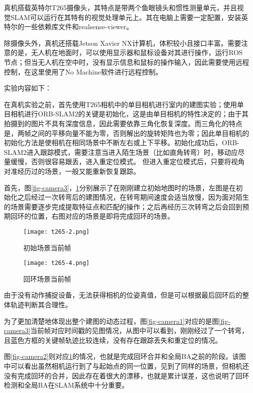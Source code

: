 真机搭载英特尔T265摄像头，其特点是带两个鱼眼镜头和惯性测量单元，并且视觉SLAM可以运行在其特有的视觉处理单元上。其在电脑上需要一定配置，安装英特尔的一些依赖库文件和realsense-viewer。

除摄像头外，真机还搭载Jetson Xavier NX计算机，体积较小且接口丰富。需要注意的是，无人机在地面时，可以使用显示器和鼠标设备对其进行操作，运行ROS节点；但当无人机在空中时，没有显示信息和鼠标的操作输入，因此需要使用远程控制，在这里使用了No Machine软件进行远程控制。

实验内容如下：

在真机实验之前，首先使用T265相机中的单目相机进行室内的建图实验；使用单目相机进行ORB-SLAM2的关键是初始化，这是由单目相机的特性决定的；由于其拍摄到的图片不具有深度信息，因此需要依靠三角化恢复深度。而三角化的特点是，两帧之间的平移向量不能为零，否则解出的旋转矩阵也为零；因此单目相机的初始化方法是使相机在相同场景中不断左右或上下平移。初始化成功后，ORB-SLAM2进入跟踪模式，需要注意当进入陌生场景（比如直角转弯）时，移动应尽量缓慢，否则很容易跟丢，进入重定位模式。
但进入重定位模式后，只要将视角对准经历过的场景，一般又能重新恢复跟踪。

首先，图\ref{fig-camera3}，\ref{fig-camera4}分别展示了在刚刚建立初始地图时的场景，左图是在初始化之后经过一次转弯后的建图情况，在转弯期间速度会适当放慢，因为面对陌生的场景需要逐步完成提取特征点和匹配的操作；之后再经历三次转弯之后会回到预期回环的位置，右图对应的场景是即将完成回环的场景。
~\\
\begin{figure}[htbp]
	\centering
	\begin{minipage}[t]{0.4\columnwidth} %
		\centering
		\texttt{[image: t265-2.png]}
		\caption{初始场景当前帧}
		\label{fig-camera3}
	\end{minipage}
	\begin{minipage}[t]{0.4\columnwidth}
		\centering
		\texttt{[image: t265-4.png]}
		\caption{回环场景当前帧}
		\label{fig-camera4}
	\end{minipage}
\end{figure}

由于没有动作捕捉设备，无法获得相机的位姿真值，但是可以根据最后回环后的整体轨迹判断其合理性。

为了更加清楚地体现出整个建图的动态过程，图\ref{fig-camera1}对应的是图\ref{fig-camera3}当前帧对应时间戳的见图情况，从图中可以看到，刚刚经过了一个转弯，且蓝色方框的关键帧轨迹比较连续，没有存在跟踪丢失和重定位的情况。

图\ref{fig-camera2}则对应\ref{fig-camera4}的情况，也就是完成回环合并和全局BA之前的阶段。该图中可以看出虽然相机运行到了与起始点的同一位置，见到了同样的场景，但相机还没有完成回环的合并，因此存在着很大的漂移，也就是累计误差，这也说明了回环检测和全局BA在SLAM系统中十分重要。




